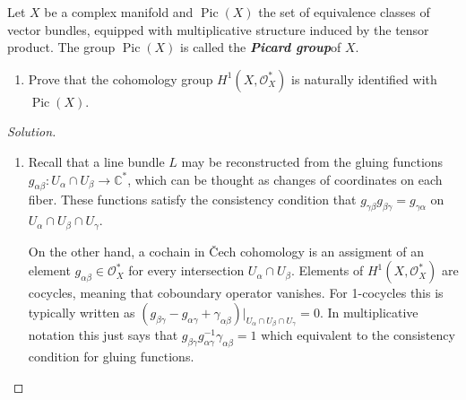 \begin{manualexercise}{1.7}
	Let $X$ be a complex manifold and $\operatorname{Pic}(X)$ the set of equivalence classes of vector bundles, equipped with multiplicative structure induced by the tensor product. The group $\operatorname{Pic}(X)$ is called the \textit{\textbf{Picard group}}of $X$.
	\begin{enumerate}[label=\alph*.]
		\item Prove that the cohomology group $H^{1}(X,\mathcal{O}^*_X)$ is naturally identified with $\operatorname{Pic}(X)$.
\iffalse		\item Consider the \textit{\textbf{exponential exact sequence}}
			\[\begin{tikzcd}
				0\arrow[r]&0\arrow[r]&\mathbb{Z}_X\arrow[r]&\mathcal{O}_X\arrow[r]&0
			\end{tikzcd}\]
			where $\mathbb{Z}_X$ denotes the constant sheaf. The corresponding long exact sequence
			\[\begin{tikzcd}[column sep=small]
				\cdots\arrow[r]&H^{1}(X,\mathcal{O}_X)\arrow[r]&H^{1}(X,\mathcal{O}^*_X)\arrow[r]&H^{2}(X,\mathbb{Z})\arrow[r]&\cdots
			\end{tikzcd}\]
			takes a line bundle $[L]\in\operatorname{Pic}(X)=H^{1}(X,\mathcal{O}^*_X)$ to an element $c_1(L)\in H^{2}(X,\mathbb{Z})$ called the \textit{\textbf{first Chern class of $L$}}. PRove that a non-trivial bundle $L$ with $c_1(L)=0$ on a compact complex curve has no holomorphic sections.

		\item (*) [content…]\fi
	\end{enumerate}
\end{manualexercise}

\begin{proof}[Solution]\leavevmode
	\begin{enumerate}[label=\alph*.]
	\item Recall that a line bundle $L$ may be reconstructed from the gluing functions $g_{\alpha\beta}:U_\alpha \cap U_\beta\to \mathbb{C}^*$, which can be thought as changes of coordinates on each fiber. These functions satisfy the consistency condition that  $g_{\gamma\beta}g_{\beta\gamma}=g_{\gamma\alpha}$ on $U_\alpha\cap U_\beta\cap U_{\gamma}$.

		On the other hand, a cochain in \v Cech cohomology is an assigment of an element $g_{\alpha\beta}\in \mathcal{O}^*_X$ for every intersection $U_\alpha\cap U_\beta$. Elements of $H^{1}(X,\mathcal{O}^*_X)$ are cocycles, meaning that coboundary operator vanishes. For 1-cocycles this is typically written as $(g_{\beta\gamma}-g_{\alpha\gamma}+\gamma_{\alpha\beta})|_{U_\alpha\cap U_\beta\cap U_\gamma}=0$. In multiplicative notation this just says that $g_{\beta\gamma}g^{-1}_{\alpha\gamma}\gamma_{\alpha\beta}=1$ which equivalent to the consistency condition for gluing functions.
	\end{enumerate}
\end{proof}

